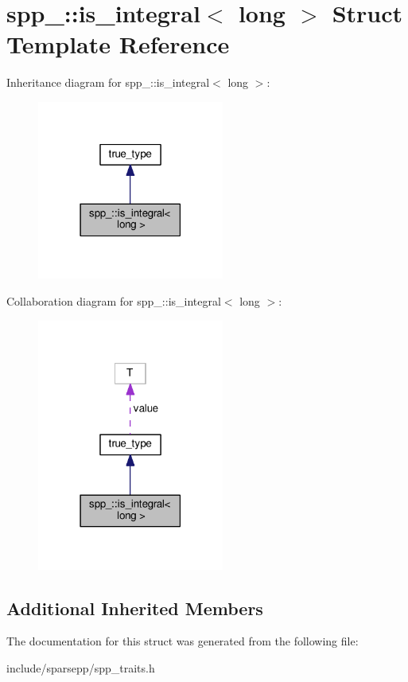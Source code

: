 \hypertarget{structspp___1_1is__integral_3_01long_01_4}{}\section{spp\+\_\+\+:\+:is\+\_\+integral$<$ long $>$ Struct Template Reference}
\label{structspp___1_1is__integral_3_01long_01_4}


Inheritance diagram for spp\+\_\+\+:\+:is\+\_\+integral$<$ long $>$\+:\nopagebreak
\begin{figure}[H]
\begin{center}
\leavevmode
\includegraphics[width=174pt]{structspp___1_1is__integral_3_01long_01_4__inherit__graph}
\end{center}
\end{figure}


Collaboration diagram for spp\+\_\+\+:\+:is\+\_\+integral$<$ long $>$\+:\nopagebreak
\begin{figure}[H]
\begin{center}
\leavevmode
\includegraphics[width=174pt]{structspp___1_1is__integral_3_01long_01_4__coll__graph}
\end{center}
\end{figure}
\subsection*{Additional Inherited Members}


The documentation for this struct was generated from the following file\+:\begin{DoxyCompactItemize}
\item 
include/sparsepp/spp\+\_\+traits.\+h\end{DoxyCompactItemize}
